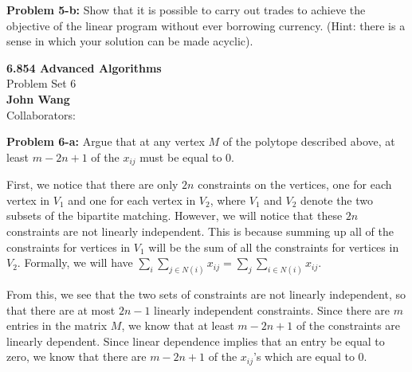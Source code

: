 \documentclass[psamsfonts]{amsart}
\newenvironment{sol}{\vspace{0.25cm}{\large \bfseries Solution:}}{\qedsymbol}
\newenvironment{prob}[1]{\begin{framed}{\large \bfseries Problem #1:}}{\end{framed}}
\newcommand{\makenewtitle}{
    \begin{center}
    {\huge \bfseries 6.854 Advanced Algorithms} \\
    Problem Set 6\\
    \vspace{0.25cm}
    {\bfseries John Wang} \\
    Collaborators: 
    \end{center}
    \vspace{0.5cm}
}
\begin{document}
\begin{prob}{5-b}
Show that it is possible to carry out trades to achieve the objective of the linear program without ever borrowing currency. (Hint: there is a sense in which your solution can be made acyclic). 
\end{prob}
\begin{sol}

\end{sol}

\newpage
\makenewtitle

\begin{prob}{6-a}
Argue that at any vertex $M$ of the polytope described above, at least $m - 2n + 1$ of the $x_{ij}$ must be equal to 0. 
\end{prob}
\begin{sol}
First, we notice that there are only $2n$ constraints on the vertices, one for each vertex in $V_1$ and one for each vertex in $V_2$, where $V_1$ and $V_2$ denote the two subsets of the bipartite matching. However, we will notice that these $2n$ constraints are not linearly independent. This is because summing up all of the constraints for vertices in $V_1$ will be the sum of all the constraints for vertices in $V_2$. Formally, we will have $\sum_{i} \sum_{j \in N(i)} x_{ij} = \sum_{j} \sum_{i \in N(i)} x_{ij}$.

From this, we see that the two sets of constraints are not linearly independent, so that there are at most $2n-1$ linearly independent constraints. Since there are $m$ entries in the matrix $M$, we know that at least $m - 2n + 1$ of the constraints are linearly dependent. Since linear dependence implies that an entry be equal to zero, we know that there are $m - 2n + 1$ of the $x_{ij}$'s which are equal to 0.
\end{sol}
\end{document}
